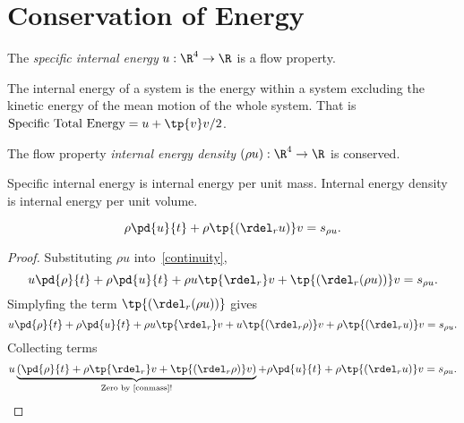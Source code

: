 \section{Conservation of Energy}
\begin{df}
    The \emph{specific internal energy} $u:\R^4\to \R$ is a flow property.
\end{df}

\begin{rk}
The internal energy of a system is the energy within a system excluding
the kinetic energy of the mean motion of the whole system.  That is
$\text{Specific Total Energy} = u + \tp{v}v/2$.
\end{rk}

\begin{df}
    The flow property \emph{internal energy density} $(\rho u):\R^4\to \R$ is conserved.
\end{df}

\begin{rk}
Specific internal energy is internal energy per unit mass.
Internal energy density is internal energy per unit volume.
\end{rk}

\begin{thm}
    \begin{equation}
    \label{conenergy}
         \rho \pd{u}{t} + \rho \tp{(\rdel_r u )} v  = s_{\rho u}.
    \end{equation}
\end{thm}
\begin{proof}
    Substituting $\rho u$ into~\autoref{continuity},
    \begin{equation}
        u \pd{\rho}{t} + \rho \pd{u}{t} + \rho u \tp{\rdel_r} v  +  \tp{(\rdel_r (\rho u) )} v = s_{\rho u}.
    \end{equation}
    Simplyfing the term $\tp{(\rdel_r (\rho u) )}$ gives
    \begin{equation}
    u \pd{\rho}{t} + \rho \pd{u}{t} + \rho u \tp{\rdel_r} v + u \tp{(\rdel_r \rho )} v + \rho \tp{(\rdel_r u )} v = s_{\rho u}.
    \end{equation}
    Collecting terms
    \begin{equation}
        u \underbrace{\left( \pd{\rho}{t} + \rho \tp{\rdel_r}v + \tp{(\rdel_r \rho )} v \right)}_{
            \text{Zero by~\autoref{conmass}!}}
        + \rho \pd{u}{t} + \rho \tp{(\rdel_r u )} v  = s_{\rho u}.
    \end{equation}
\end{proof}


